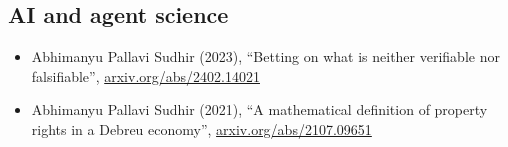 \documentclass{article}
\begin{document}
\subsection*{AI and agent science}

\begin{itemize}

\item 
Abhimanyu Pallavi Sudhir (2023), ``Betting on what is neither verifiable nor falsifiable'', \href{https://arxiv.org/abs/2402.14021}{arxiv.org/abs/2402.14021}

\item
Abhimanyu Pallavi Sudhir (2021),
``A mathematical definition of property rights in a Debreu economy'', 
\href{https://arxiv.org/abs/2107.09651}{arxiv.org/abs/2107.09651}

\end{itemize}
\end{document}
